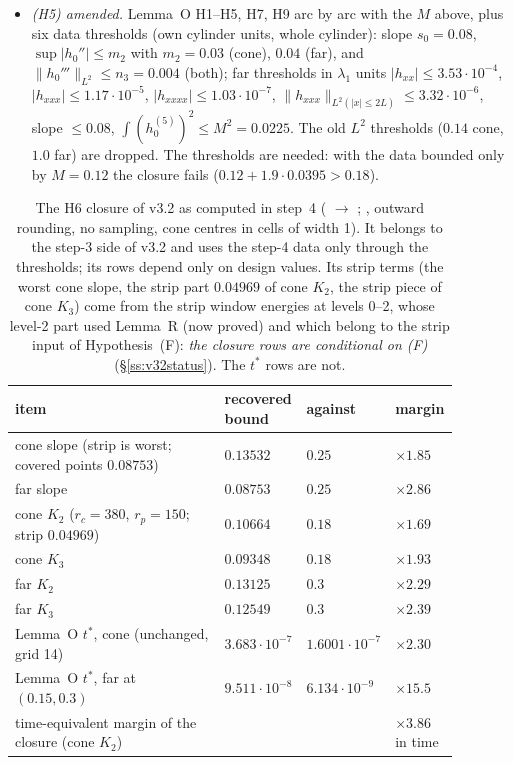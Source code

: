 \documentclass[11pt]{article}
\theoremstyle{definition}
\theoremstyle{remark}
\newcommand{\fn}[1]{\texttt{\detokenize{#1}}}
\newcommand{\abs}[1]{\lvert #1\rvert}
\newcommand{\norm}[1]{\lVert #1\rVert}
\begin{document}
\begin{itemize}
\item \emph{(H5) amended.} Lemma~O H1--H5, H7, H9 arc by arc with the $M$ above, plus six data thresholds (own cylinder units, whole cylinder): slope $s_0=0.08$, $\sup\abs{h_0''}\le m_2$ with $m_2=0.03$ (cone), $0.04$ (far), and $\norm{h_0'''}_{L^2}\le n_3=0.004$ (both); far thresholds in $\lambda_1$ units $\abs{h_{xx}}\le3.53\cdot10^{-4}$, $\abs{h_{xxx}}\le1.17\cdot10^{-5}$, $\abs{h_{xxxx}}\le1.03\cdot10^{-7}$, $\norm{h_{xxx}}_{L^2(\abs x\le2L)}\le3.32\cdot10^{-6}$, slope $\le0.08$, $\int(h_0^{(5)})^2\le M^2=0.0225$. The old $L^2$ thresholds ($0.14$ cone, $1.0$ far) are dropped. The thresholds are needed: with the data bounded only by $M=0.12$ the closure fails ($0.12+1.9\cdot0.0395>0.18$).
\end{itemize}

\begin{table}[htbp]\centering\small
\caption{The H6 closure of v3.2 as computed in step~4 (\fn{p2/t9_h6_v32.py} $\to$ \fn{t9_h6_v32.json}; \fn{arb}, outward rounding, no sampling, cone centres in cells of width 1). It belongs to the step-3 side of v3.2 and uses the step-4 data only through the thresholds; its rows depend only on design values. Its strip terms (the worst cone slope, the strip part $0.04969$ of cone $K_2$, the strip piece of cone $K_3$) come from the strip window energies at levels 0--2, whose level-2 part used Lemma~R (now proved) and which belong to the strip input of Hypothesis~(F): \emph{the closure rows are conditional on (F)} (\S\ref{ss:v32status}). The $t^*$ rows are not.}\label{tab:v32}
\begin{tabular}{@{}L{0.52\linewidth}L{0.14\linewidth}L{0.10\linewidth}L{0.12\linewidth}@{}}\toprule
item & recovered bound & against & margin\\\midrule
cone slope (strip is worst; covered points $0.08753$) & $0.13532$ & $0.25$ & $\times1.85$\\
far slope & $0.08753$ & $0.25$ & $\times2.86$\\
cone $K_2$ ($r_c=380$, $r_p=150$; strip $0.04969$) & $0.10664$ & $0.18$ & $\times1.69$\\
cone $K_3$ & $0.09348$ & $0.18$ & $\times1.93$\\
far $K_2$ & $0.13125$ & $0.3$ & $\times2.29$\\
far $K_3$ & $0.12549$ & $0.3$ & $\times2.39$\\
Lemma~O $t^*$, cone (unchanged, grid 14) & $3.683\cdot10^{-7}$ & $1.6001\cdot10^{-7}$ & $\times2.30$\\
Lemma~O $t^*$, far at $(0.15,0.3)$ & $9.511\cdot10^{-8}$ & $6.134\cdot10^{-9}$ & $\times15.5$\\
time-equivalent margin of the closure (cone $K_2$) & & & $\times3.86$ in time\\\bottomrule
\end{tabular}\end{table}
\end{document}
